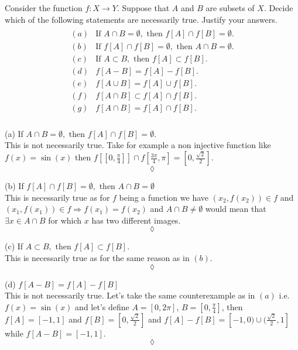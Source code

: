 \subsection{}
\begin{tcolorbox}
Consider the function $f:X\rightarrow Y$. Suppose that $A$ and $B$ are subsets of $X$. Decide which of the following statements are necessarily true. Justify your answers.
\begin{align*}
\begin{array}{ll}
(a)&\text{If } A\cap B =\emptyset, \text{ then } f[A]\cap f[B]=\emptyset . \\
(b)&\text{If } f[A]\cap f[B]=\emptyset, \text{ then }  A\cap B =\emptyset .  \\
(c)& \text{If } A\subset B , \text{ then } f[A]\subset f[B].  \\
(d)&f[A-B] = f[A]-f[B].  \\
(e)&f[A\cup B]= f[A]\cup f[B].  \\
(f)&f[A\cap B]\subset f[A]\cap f[B].  \\
(g)&f[A\cap B]= f[A]\cap f[B].  \\
\end{array}
\end{align*}
\end{tcolorbox}
(a) If $A\cap B =\emptyset, \text{ then } f[A]\cap f[B]=\emptyset $. \\
This is not necessarily true. Take for example a non injective function like $f(x)=\sin(x)$  then $f[[0,\frac{\pi}{4}]]\cap f[\frac{3\pi}{4}, \pi]= [0,\frac{\sqrt{2}}{2}]$. 
$$\lozenge$$

(b) If $f[A]\cap f[B]=\emptyset, \text{ then }  A\cap B =\emptyset$ \\
This is  necessarily true as for $f$ being a function we have $\left( x_2,f(x_2)\right)\in f$ and $\left( x_1,f(x_1)\right)\in f \Rightarrow f(x_1)=f(x_2)$ and $ A\cap B \ne\emptyset$ would mean that $\exists x\in A\cap B$ for which $x$ has two different images.
$$\lozenge$$

(c) If $A\subset B , \text{ then } f[A]\subset f[B].$ \\
This is  necessarily true as for the same reason as in $(b)$.
$$\lozenge$$

(d)  $f[A-B] = f[A]-f[B]$ \\
This is  not necessarily true. Let's take the same counterexample as in $(a)$ i.e. $f(x)=\sin(x)$  and let's define $A= [0,2\pi]$, $B=[0,\frac{\pi}{4}]$, then $f[A] =  [-1,1]$ and $f[B]=[0,\frac{\sqrt{2}}{2}]$ and $f[A]-f[B] =  [-1,0)\cup (\frac{\sqrt{2}}{2},1]$ while $f[A-B]=[-1,1]$.
$$\lozenge$$

